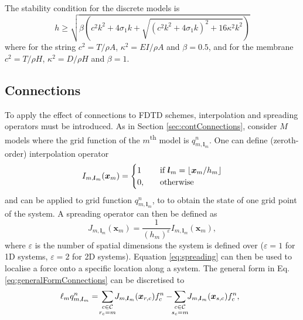 \documentclass{article}
\begin{document}
The stability condition for the discrete models is
\begin{equation}
    h\geq \sqrt{\beta\left(c^2k^2 + 4 \sigma_1k+\sqrt{(c^2k^2 + 4 \sigma_1k)^2 + 16 \kappa^2k^2}\right)}
\end{equation}
where for the string $c^2 = T/\rho A$, $\kappa^2 = EI/\rho A$ and $\beta = 0.5$, and for the membrane $c^2 = T / \rho H$, $\kappa^2 = D/\rho H$ and $\beta = 1$. 
\subsection{Connections}\label{sec:discConnections}

To apply the effect of connections to FDTD schemes, interpolation and spreading operators must be introduced. As in Section \ref{sec:contConnections}, consider $M$ models where the grid function of the $m$\textsuperscript{th} model is $q_{m, \boldsymbol{l}_m}^n$. One can define (zeroth-order) interpolation operator
\begin{equation}
    I_{m, \boldsymbol{l}_m}(\boldsymbol{x}_m) = \begin{cases}
    1&\quad \text{if}\ \boldsymbol{l}_m= \floor[\boldsymbol{x}_m/h_m]\\
    0, &\quad\text{otherwise}
    \end{cases}
\end{equation}
and can be applied to grid function $q_{m, \boldsymbol{l}_m}^n$, to to obtain the state of one grid point of the system. A spreading operator can then be defined as
\begin{equation}\label{eq:spreading}
    J_{m, \boldsymbol{l}_m}(\boldsymbol{x}_m) = \frac{1}{(h_m)^\varepsilon}I_{m, \boldsymbol{l}_m}(\boldsymbol{x}_m),
\end{equation}
where $\varepsilon$ is the number of spatial dimensions the system is defined over ($\varepsilon = 1$ for 1D systems, $\varepsilon = 2$ for 2D systems). Equation \eqref{eq:spreading} can then be used to localise a force onto a specific location along a system. 
The general form in Eq. \eqref{eq:generalFormConnections} can be discretised to
\begin{equation}\label{eq:generalFormConnections}
    \!\!\!\ell_mq_{m, \boldsymbol{l}_m}^n =\!\sum_{\substack{c\in \mathcal{C}\vspace{0.1em}\\ r_c = m}}\!\! J_{m, \boldsymbol{l}_m}(\boldsymbol{x}_{r, c}) f_c^n-\!\! \sum_{\substack{c\in \mathcal{C}\vspace{0.1em}\\ s_c = m}}\!\! J_{m, \boldsymbol{l}_m}(\boldsymbol{x}_{s, c}) f_c^n,
\end{equation}
\end{document}
